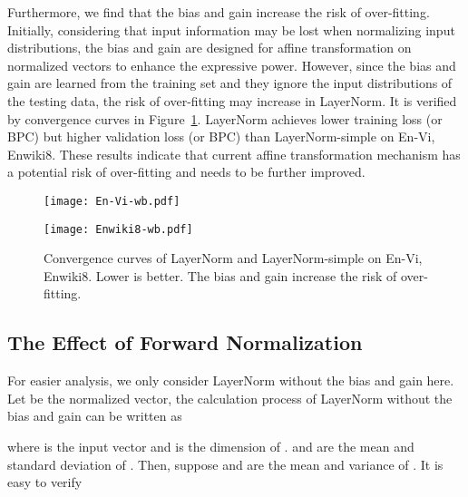 \documentclass{article}
\begin{document}
Furthermore, we find that the bias and gain increase the risk of over-fitting. 
Initially, considering that input information may be lost when normalizing input distributions, the bias and gain are designed for affine transformation on normalized vectors to enhance the expressive power. However, since the bias and gain are learned from the training set and they ignore the input distributions of the testing data, the risk of over-fitting may increase in LayerNorm.
It is verified by convergence curves in Figure~\ref{fig:wb}. 
LayerNorm achieves lower training loss (or BPC) but higher validation loss (or BPC) than LayerNorm-simple on En-Vi, Enwiki8.  These results indicate that current affine transformation mechanism has a potential risk of over-fitting and needs to be further improved. 


  
\begin{figure}[ht]
\centering
\small
\begin{minipage}{.4\textwidth}
  \centering
  \texttt{[image: En-Vi-wb.pdf]}
\end{minipage}\begin{minipage}{.4\textwidth}
  \centering
  \texttt{[image: Enwiki8-wb.pdf]}
\end{minipage}

\caption{Convergence curves of LayerNorm and LayerNorm-simple on En-Vi, Enwiki8. Lower is better. The bias and gain increase the risk of over-fitting. }

 \label{fig:wb}
 \vspace{-0.1in}
\end{figure}





  


\subsection{The Effect of Forward Normalization}








 
For easier analysis, we only consider LayerNorm without the bias and gain here. Let  be the normalized vector, the calculation process of LayerNorm without the bias and gain can be written as

where  is the input vector and  is the dimension of .  and  are the mean and standard deviation of . Then, suppose  and  are the mean and variance of . It is easy to verify 
\end{document}
